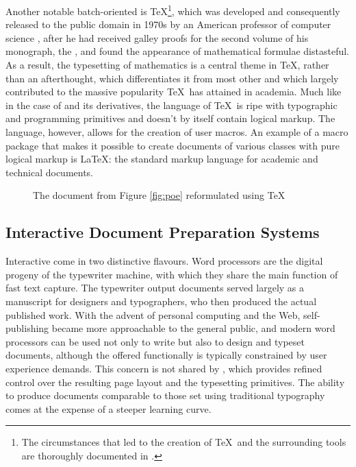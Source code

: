 \documentclass[a5paper,10pt]{book}
\begin{document}
Another notable batch-oriented  is \TeX{}\footnote{
  The circumstances that led to the creation of \TeX\ and the surrounding tools
  are thoroughly documented in \textcite{knuth98}.
}, which was developed and consequently released to the public domain in 1970s
by an American professor of computer science , after he had
received galley proofs for the second volume of his monograph, the , and found the appearance of mathematical formulae
distasteful. As a result, the typesetting of mathematics is a central theme in
\TeX, rather than an afterthought, which differentiates it from most other
 and which largely contributed to the massive popularity \TeX\ has
attained in academia. Much like in the case of  and its
derivatives, the language of \TeX\ is ripe with typographic and programming
primitives and doesn't by itself contain logical markup. The language, however,
allows for the creation of user macros. An example of a macro package that makes
it possible to create documents of various classes with pure logical markup is
\LaTeX{}: the standard markup language for academic and
technical documents.

\begin{figure}
  \caption{The  document from Figure \ref{fig:poe} reformulated
    using \TeX}
\end{figure}

\subsection{Interactive Document Preparation Systems}
Interactive  come in two distinctive flavours. Word processors
 are the digital progeny of the
typewriter machine, with which they share the main function of fast text
capture. The typewriter output documents served largely as a manuscript for
designers and typographers, who then produced the actual published work. With
the advent of personal computing and the Web, self-publishing became more
approachable to the general public, and modern word processors can be used not
only to write but also to design and typeset documents, although the offered
functionally is typically constrained by user experience demands. This concern
is not shared by , which provides
refined control over the resulting page layout and the typesetting primitives.
The ability to produce documents comparable to those set using traditional
typography comes at the expense of a steeper learning curve.
\end{document}
